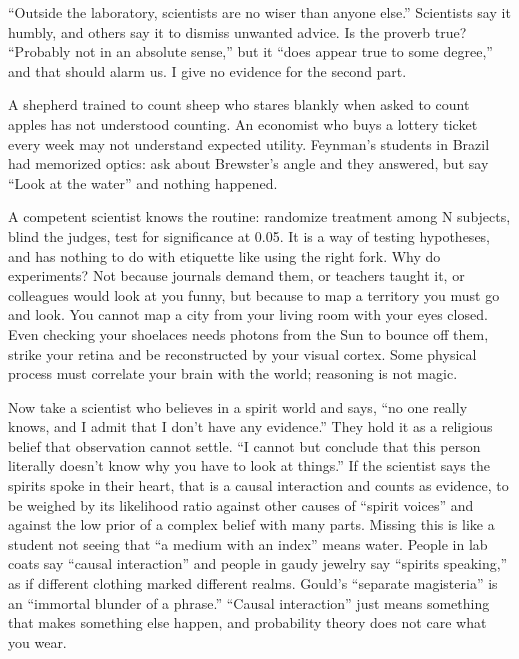 
``Outside the laboratory, scientists are no wiser than anyone else.'' Scientists say it humbly, and others say it to dismiss unwanted advice. Is the proverb true? ``Probably not in an absolute sense,'' but it ``does appear true to some degree,'' and that should alarm us. I give no evidence for the second part. 

A shepherd trained to count sheep who stares blankly when asked to count apples has not understood counting. An economist who buys a lottery ticket every week may not understand expected utility.  Feynman's students in Brazil had memorized optics: ask about Brewster's angle and they answered, but say ``Look at the water'' and nothing happened.

A competent scientist knows the routine: randomize treatment among N subjects, blind the judges, test for significance at 0.05. It is a way of testing hypotheses, and has nothing to do with etiquette like using the right fork. Why do experiments? Not because journals demand them, or teachers taught it, or colleagues would look at you funny, but because to map a territory you must go and look. You cannot map a city from your living room with your eyes closed. Even checking your shoelaces needs photons from the Sun to bounce off them, strike your retina and be reconstructed by your visual cortex. Some physical process must correlate your brain with the world; reasoning is not magic.

Now take a scientist who believes in a spirit world and says, ``no one really knows, and I admit that I don't have any evidence.'' They hold it as a religious belief that observation cannot settle. ``I cannot but conclude that this person literally doesn't know why you have to look at things.'' If the scientist says the spirits spoke in their heart, that is a causal interaction and counts as evidence, to be weighed by its likelihood ratio against other causes of ``spirit voices'' and against the low prior of a complex belief with many parts. Missing this is like a student not seeing that ``a medium with an index'' means water. People in lab coats say ``causal interaction'' and people in gaudy jewelry say ``spirits speaking,'' as if different clothing marked different realms. Gould's ``separate magisteria'' is an ``immortal blunder of a phrase.'' ``Causal interaction'' just means something that makes something else happen, and probability theory does not care what you wear.

